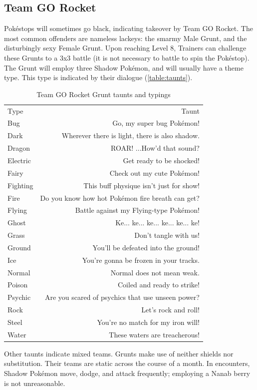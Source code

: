 \subsection{Team GO Rocket}
\label{subsec:rocket}
Pokéstops will sometimes go black, indicating takeover by Team GO Rocket.
The most common offenders are nameless lackeys: the smarmy Male Grunt, and the disturbingly sexy Female Grunt.
Upon reaching Level 8, Trainers can challenge these Grunts to a 3x3 battle (it is not necessary to battle to spin the Pokéstop).
The Grunt will employ three Shadow Pokémon, and will usually have a theme type.
This type is indicated by their dialogue (\autoref{table:taunts}).
\begin{table}
\centering
\begin{tabular}{lr}
Type & Taunt\\
\Midrule
  Bug & Go, my super bug Pokémon!\\
  Dark & Wherever there is light, there is also shadow.\\
  Dragon & ROAR! ...How'd that sound?\\
  Electric & Get ready to be shocked!\\
  Fairy & Check out my cute Pokémon!\\
  Fighting & This buff physique isn't just for show!\\
  Fire & Do you know how hot Pokémon fire breath can get?\\
  Flying & Battle against my Flying-type Pokémon!\\
  Ghost & Ke... ke... ke... ke... ke... ke!\\
  Grass & Don't tangle with us!\\
  Ground & You'll be defeated into the ground!\\
  Ice & You're gonna be frozen in your tracks.\\
  Normal & Normal does not mean weak.\\
  Poison & Coiled and ready to strike!\\
  Psychic & Are you scared of psychics that use unseen power?\\
  Rock & Let's rock and roll!\\
  Steel & You're no match for my iron will!\\
  Water & These waters are treacherous!\\
\end{tabular}
\caption{Team GO Rocket Grunt taunts and typings}
\label{table:taunts}
\end{table}
Other taunts indicate mixed teams.
Grunts make use of neither shields nor substitution.
Their teams are static across the course of a month.
In encounters, Shadow Pokémon move, dodge, and attack frequently; employing a Nanab berry is not unreasonable.

